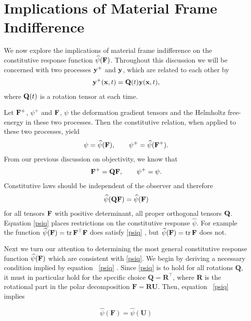 \section{Implications of Material Frame Indifference}
We now explore the implications of material frame indifference on the constitutive response
function $\widehat{\psi}(\mathbf{F})$. Throughout this discussion we will be concerned with two processes $\mathbf{y}^+$ and $\mathbf{y}$, which are related to each other by
\begin{equation}
\mathbf{y}^+(\mathbf{x},t)=\mathbf{Q}(t)\mathbf{y}(\mathbf{x},t),
\end{equation}
where $\mathbf{Q}(t)$ is a rotation tensor at each time.

Let $\mathbf{F}^+$, $\psi^+$ and $\mathbf{F}$, $\psi$ the deformation gradient tensors and the Helmholtz free-energy in these two processes.  Then the constitutive
relation, when applied to these two processes, yield
\begin{equation}
\psi=\widehat{\psi}(\mathbf{F}), \qquad \psi^+=\widehat{\psi}(\mathbf{F}^+).
\end{equation}
From our previous discussion on objectivity, we know that
\begin{equation}
\mathbf{F}^+=\mathbf{Q}\mathbf{F}, \qquad \psi^+=\psi.
\end{equation}
Constitutive laws should be independent of the observer and therefore
\begin{equation}\label{psiq}
\widehat{\psi}(\mathbf{Q}\mathbf{F})=\widehat{\psi}(\mathbf{F})
\end{equation}
for all tensors $\mathbf{F}$ with positive determinant, all proper orthogonal tensors $\mathbf{Q}$. Equation \eqref{psiq} places restrictions on the constitutive response $\widehat{\psi}$. For example
the function $\widehat{\psi}(\mathbf{F})=\operatorname{tr}\mathbf{F}^\top\mathbf{F}$ does satisfy  \eqref{psiq} , but $\widehat{\psi}(\mathbf{F})=\operatorname{tr}\mathbf{F}$ does not.

Next we turn our attention to determining the most general constitutive response function  $\widehat{\psi}(\mathbf{F})$ which are consistent with  \eqref{psiq}.  We begin by deriving a necessary condition implied by equation~ \eqref{psiq} . Since  \eqref{psiq}  is to hold for all  
rotations \( \mathbf{Q} \), it must in particular hold for the specific choice \( \mathbf{Q} = \mathbf{R}^\top \),  
where \( \mathbf{R} \) is the rotational part in the polar decomposition \( \mathbf{F} = \mathbf{R} \mathbf{U} \).  
Then, equation~ \eqref{psiq} implies  

\begin{definition}
	\begin{equation}\label{psiU}
	\widehat{\psi}(\mathbf{F}) = \widehat{\psi}(\mathbf{U}) 
\end{equation}
\end{definition}

